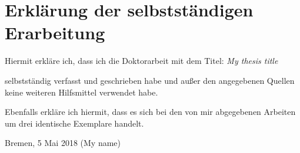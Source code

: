 \cleardoublepage
\chapter*{Erkl\"arung der selbstst\"andigen Erarbeitung}



Hiermit erkl\"{a}re ich, dass ich die Doktorarbeit mit dem Titel:
\textit{My thesis title}

selbstst\"{a}ndig verfasst und geschrieben habe und außer den angegebenen Quellen keine weiteren Hilfsmittel verwendet habe.

Ebenfalls erkl\"{a}re ich hiermit, dass es sich bei den von mir abgegebenen Arbeiten um drei identische Exemplare handelt.

\begin{flushleft}
Bremen, 5 Mai 2018 \underline{\hspace{6.3cm}}
\hspace*{5cm}(My name)
\end{flushleft}
